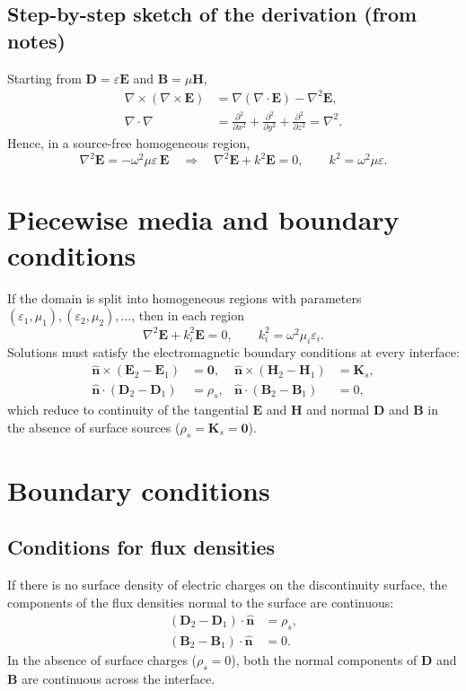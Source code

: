 \subsection*{Step-by-step sketch of the derivation (from notes)}

Starting from $\mathbf{D}=\varepsilon \mathbf{E}$ and $\mathbf{B}=\mu \mathbf{H}$,
\begin{align}
    \nabla\times(\nabla\times \mathbf{E})
    &= \nabla(\nabla\!\cdot\!\mathbf{E})-\nabla^2\mathbf{E},\\
    \nabla\!\cdot\!\nabla &= 
      \frac{\partial^2}{\partial x^2}
    + \frac{\partial^2}{\partial y^2}
    + \frac{\partial^2}{\partial z^2}
    = \nabla^2 .
\end{align}
Hence, in a source-free homogeneous region,
\[
\nabla^2 \mathbf{E} = -\omega^2 \mu \varepsilon\,\mathbf{E}
\quad\Rightarrow\quad
\nabla^2 \mathbf{E} + k^2 \mathbf{E}=0,
\qquad
k^2=\omega^2 \mu \varepsilon .
\]
\section*{Piecewise media and boundary conditions}

If the domain is split into homogeneous regions with parameters $(\varepsilon_1,\mu_1),(\varepsilon_2,\mu_2),\dots$, then in each region
\[
\nabla^2 \mathbf{E} + k_i^2 \mathbf{E}=0, \qquad
k_i^2=\omega^2 \mu_i \varepsilon_i .
\]
Solutions must satisfy the electromagnetic boundary conditions at every interface:
\begin{align}
    \hat{\mathbf{n}}\times(\mathbf{E}_2-\mathbf{E}_1) &= \mathbf{0}, &
    \hat{\mathbf{n}}\times(\mathbf{H}_2-\mathbf{H}_1) &= \mathbf{K}_s, \\
    \hat{\mathbf{n}}\cdot(\mathbf{D}_2-\mathbf{D}_1) &= \rho_s, &
    \hat{\mathbf{n}}\cdot(\mathbf{B}_2-\mathbf{B}_1) &= 0 ,
\end{align}
which reduce to continuity of the tangential $\mathbf{E}$ and $\mathbf{H}$ and normal $\mathbf{D}$ and $\mathbf{B}$ in the absence of surface sources ($\rho_s=\mathbf{K}_s=\mathbf{0}$).

\section{Boundary conditions}

\subsection*{Conditions for flux densities}
If there is no surface density of electric charges on the discontinuity surface,  
the components of the flux densities normal to the surface are continuous:
\begin{align}
    (\mathbf{D}_2 - \mathbf{D}_1)\cdot\hat{\mathbf{n}} &= \rho_s,\\
    (\mathbf{B}_2 - \mathbf{B}_1)\cdot\hat{\mathbf{n}} &= 0.
\end{align}
In the absence of surface charges ($\rho_s = 0$), both the normal components of $\mathbf{D}$ and $\mathbf{B}$ are continuous across the interface.

